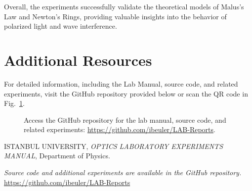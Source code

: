 \documentclass[journal]{IEEEtran}
\begin{document}
Overall, the experiments successfully validate the theoretical models of Malus's Law and Newton's Rings, providing valuable insights into the behavior of polarized light and wave interference.

\section{Additional Resources}
For detailed information, including the Lab Manual, source code, and related experiments, visit the GitHub repository provided below or scan the QR code in Fig.~\ref{fig:qr_code}.

\begin{figure}[H]
    \centering
    \begin{minipage}{0.15\textwidth}
        \centering
    \end{minipage}%
    \begin{minipage}{0.2\textwidth}
        \raggedright
        \caption{Access the GitHub repository for the lab manual, source code, and related experiments: \href{https://github.com/ibeuler/LAB-Reports}{\url{https://github.com/ibeuler/LAB-Reports}}.}
        \label{fig:qr_code}
    \end{minipage}
\end{figure}

\begin{thebibliography}{9}
    ISTANBUL UNIVERSITY, \textit{OPTICS LABORATORY
    EXPERIMENTS MANUAL}, Department of Physics.

    \textit{Source code and additional experiments are available in the GitHub repository.} \url{https://github.com/ibeuler/LAB-Reports}
\end{thebibliography}
\end{document}

